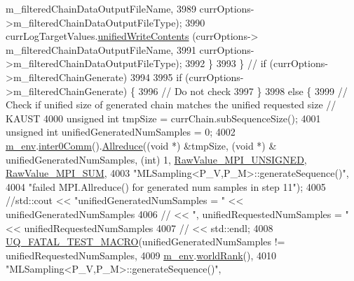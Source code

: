 \begin{DoxyCode}
      m\_filteredChainDataOutputFileName,
3989                                                    currOptions->m\_filteredChainDataOutputFileType);
3990       currLogTargetValues.\hyperlink{class_q_u_e_s_o_1_1_scalar_sequence_a2f832dd5eda37df06eb52650ab8ce733}{unifiedWriteContents}    (currOptions->
      m\_filteredChainDataOutputFileName,
3991                                                    currOptions->m\_filteredChainDataOutputFileType);
3992     \}
3993   \} \textcolor{comment}{// if (currOptions->m\_filteredChainGenerate)}
3994 
3995   \textcolor{keywordflow}{if} (currOptions->m\_filteredChainGenerate) \{
3996     \textcolor{comment}{// Do not check}
3997   \}
3998   \textcolor{keywordflow}{else} \{
3999     \textcolor{comment}{// Check if unified size of generated chain matches the unified requested size // KAUST}
4000     \textcolor{keywordtype}{unsigned} \textcolor{keywordtype}{int} tmpSize = currChain.subSequenceSize();
4001     \textcolor{keywordtype}{unsigned} \textcolor{keywordtype}{int} unifiedGeneratedNumSamples = 0;
4002     \hyperlink{class_q_u_e_s_o_1_1_m_l_sampling_a13f1ca4fe9f94822fe572a743eaced1d}{m\_env}.\hyperlink{class_q_u_e_s_o_1_1_base_environment_a689e4d140c74d495d97eb498714a4b82}{inter0Comm}().\hyperlink{class_q_u_e_s_o_1_1_mpi_comm_a72e137e60ef8060efb1ee5fc874fa4b8}{Allreduce}((\textcolor{keywordtype}{void} *) &tmpSize, (\textcolor{keywordtype}{void} *) &
      unifiedGeneratedNumSamples, (\textcolor{keywordtype}{int}) 1, \hyperlink{_mpi_comm_8h_a06cbfbc33436f6e0dc8a48ff3c49bdfc}{RawValue\_MPI\_UNSIGNED}, \hyperlink{_mpi_comm_8h_afbf78d291c032aa7f512bc566cee2bd1}{RawValue\_MPI\_SUM},
4003                                  \textcolor{stringliteral}{"MLSampling<P\_V,P\_M>::generateSequence()"},
4004                                  \textcolor{stringliteral}{"failed MPI.Allreduce() for generated num samples in step 11"});
4005     \textcolor{comment}{//std::cout << "unifiedGeneratedNumSamples = "   << unifiedGeneratedNumSamples}
4006     \textcolor{comment}{//          << ", unifiedRequestedNumSamples = " << unifiedRequestedNumSamples}
4007     \textcolor{comment}{//          << std::endl;}
4008     \hyperlink{_defines_8h_a56d63d18d0a6d45757de47fcc06f574d}{UQ\_FATAL\_TEST\_MACRO}(unifiedGeneratedNumSamples != unifiedRequestedNumSamples,
4009                         \hyperlink{class_q_u_e_s_o_1_1_m_l_sampling_a13f1ca4fe9f94822fe572a743eaced1d}{m\_env}.\hyperlink{class_q_u_e_s_o_1_1_base_environment_a78b57112bbd0e6dd0e8afec00b40ffa7}{worldRank}(),
4010                         \textcolor{stringliteral}{"MLSampling<P\_V,P\_M>::generateSequence()"},

\end{DoxyCode}
